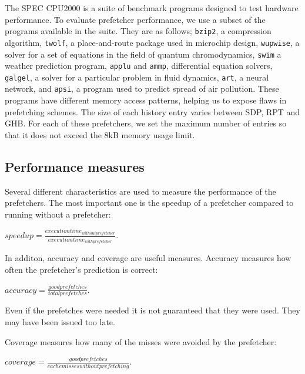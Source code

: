 The SPEC CPU2000\cite{bib:cpu2000} is a suite of benchmark programs
designed to test hardware performance.  To evaluate prefetcher
performance, we use a subset of the programs available in the suite.
They are as follows; \texttt{bzip2}, a compression algorithm,
\texttt{twolf}, a place-and-route package used in microchip design,
\texttt{wupwise}, a solver for a set of equations in the field of
quantum chromodynamics, \texttt{swim} a weather prediction program,
\texttt{applu} and \texttt{ammp}, differential equation solvers,
\texttt{galgel}, a solver for a particular problem in fluid dynamics,
\texttt{art}, a neural network, and \texttt{apsi}, a program used to
predict spread of air pollution.  These programs have different memory
access patterns, helping us to expose flaws in prefetching schemes.
The size of each history entry varies between SDP, RPT and GHB. For
each of these prefetchers, we set the maximum number of entries so
that it does not exceed the $8$kB memory usage limit.

\subsection{Performance measures}
Several different characteristics are used to measure the performance
of the prefetchers. The most important one is the speedup of a
prefetcher compared to running without a prefetcher:

$speedup = \frac{execution time_{without prefetcher}}{execution time_{with prefetcher}}$.

In additon, accuracy and coverage are useful measures. Accuracy measures
how often the prefetcher's prediction is correct:

$accuracy = \frac{good prefetches}{total prefetches}$.

Even if the prefetches were needed it is not guaranteed that they
were used. They may have been issued too late.

Coverage measures how many of the misses were avoided by the
prefetcher:

$coverage = \frac{good prefetches}{cache misses without prefetching}$.

\cite{bib:doc}

